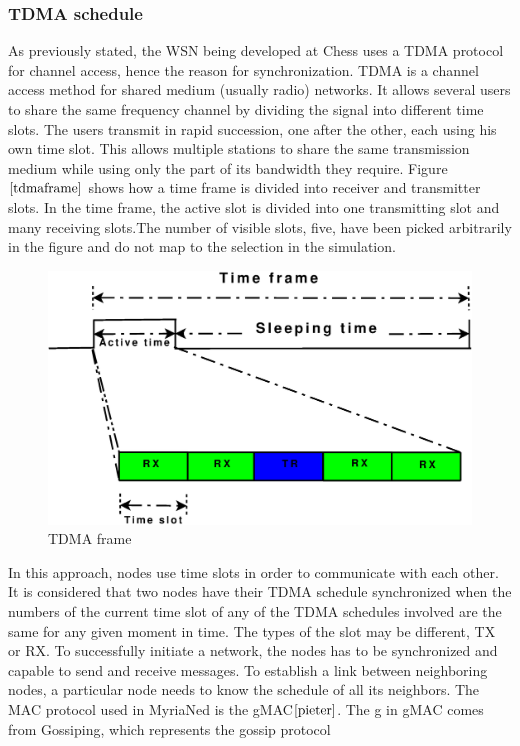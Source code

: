 \documentclass[a4paper,10pt]{report}
\begin{document}
\subsubsection{TDMA schedule}
As previously stated, the WSN being developed at Chess uses a TDMA
protocol for channel access, hence the reason for synchronization.
TDMA is a channel access method for shared medium (usually radio)
networks. It allows several users to share the same frequency
channel by dividing the signal into different time slots. The users
transmit in rapid succession, one after the other, each using his
own time slot. This allows multiple stations to share the same
transmission medium while using only the part of its bandwidth they
require. Figure $\ref{tdmaframe}$ shows how a time frame is divided
into receiver and transmitter slots. In the time frame, the active
slot is divided into one transmitting slot and many receiving
slots.The number of visible slots, five, have been picked
arbitrarily in the figure and do not map to the selection in the
simulation.
\begin{figure}
\centering
\includegraphics[width=0.75 \textwidth]{tdmaframe}
\caption{TDMA frame} \label{tdmaframe}
\end{figure}
\newline In this approach, nodes use time slots in order to
communicate with each other. It is considered that two nodes have
their TDMA schedule synchronized when the numbers of the current
time slot of any of the TDMA schedules involved are the same for any
given moment in time. The types of the slot may be different, TX or
RX. To successfully initiate a network, the nodes has to be
synchronized and capable to send and receive messages. To establish
a link between neighboring nodes, a particular node needs to know
the schedule of all its neighbors.
\newline
The MAC protocol used in MyriaNed is the gMAC$\cite{pieter}$. The
g in gMAC comes from Gossiping, which represents the gossip protocol
\end{document}

